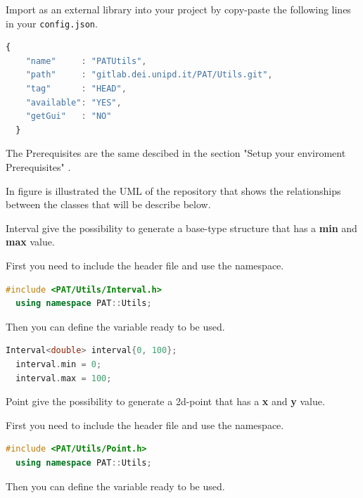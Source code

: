 

Import as an external library into your project by copy-paste the
following lines in your \texttt{config.json}.

\begin{lstlisting}[language=javascript, gobble=2]
  {
    "name"     : "PATUtils",
    "path"     : "gitlab.dei.unipd.it/PAT/Utils.git",
    "tag"      : "HEAD",
    "available": "YES",
    "getGui"   : "NO"
  }
\end{lstlisting}



The Prerequisites are the same descibed in the section "Setup your enviroment Prerequisites" .

In figure  is illustrated the UML of the repository that shows the relationships between the classes that will be describe below.



Interval give the possibility to generate a base-type structure that
has a \textbf{min} and \textbf{max} value.

First you need to include the header file and use the namespace.

\begin{lstlisting}[language=c++, gobble=2]
  #include <PAT/Utils/Interval.h>
  using namespace PAT::Utils;
\end{lstlisting}

Then you can define the variable ready to be used.

\begin{lstlisting}[language=c++, gobble=2]
  Interval<double> interval{0, 100};
  interval.min = 0;
  interval.max = 100;
\end{lstlisting}


Point give the possibility to generate a 2d-point that has a
\textbf{x} and \textbf{y} value.

First you need to include the header file and use the namespace.

\begin{lstlisting}[language=c++, gobble=2]
  #include <PAT/Utils/Point.h>
  using namespace PAT::Utils;
\end{lstlisting}

Then you can define the variable ready to be used.

